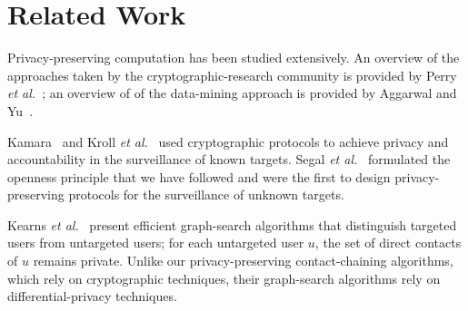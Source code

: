 \section{Related Work}\label{sec-related}
Privacy-preserving computation has been studied extensively. An overview
of the approaches taken by the cryptographic-research community is provided by
Perry {\it et al.}~\cite{pgfw-scn2014}; an overview of of the data-mining
approach is provided by Aggarwal and Yu~\cite{ay2008}.  

Kamara~\cite{kamara}
and Kroll {\it et al.}~\cite{kroll} used cryptographic protocols to 
achieve privacy and accountability in the surveillance of known targets.
Segal {\it et al.}~\cite{sff-foci2014} formulated the openness principle that
we have followed and were the first to design privacy-preserving protocols for
the surveillance of unknown targets.  

Kearns {\it et al.}~\cite{krwy-pnas16} present efficient graph-search 
algorithms that distinguish targeted users from untargeted users; for each 
untargeted user $u$, the set of direct contacts of $u$ remains private.
Unlike our privacy-preserving contact-chaining algorithms, which rely
on cryptographic techniques, their graph-search algorithms rely on 
differential-privacy techniques.
